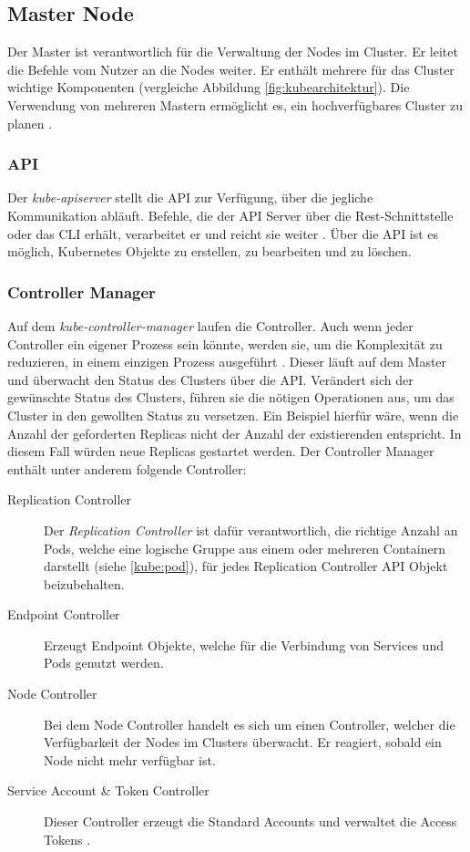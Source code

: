 \subsection{Master Node}
\label{masternode}
Der Master ist verantwortlich für die Verwaltung der Nodes im Cluster. Er leitet die Befehle vom Nutzer an die Nodes weiter. Er enthält mehrere für das Cluster wichtige Komponenten (vergleiche Abbildung \ref{fig:kubearchitektur}). Die Verwendung von mehreren Mastern ermöglicht es, ein hochverfügbares Cluster zu planen \cite[][]{9781788994729}. 

\subsubsection{API}
Der \textit{kube-apiserver} stellt die \ac{API} zur Verfügung, über die jegliche Kommunikation abläuft. Befehle, die der API Server über die Rest-Schnittstelle oder das \ac{CLI} erhält, verarbeitet er und reicht sie weiter \cite{Rensin2015Kubernetes43826}. Über die API ist es möglich, Kubernetes Objekte zu erstellen, zu bearbeiten und zu löschen.

\subsubsection{Controller Manager}
Auf dem \textit{kube-controller-manager} laufen die Controller. Auch wenn jeder Controller ein eigener Prozess sein könnte, werden sie, um die Komplexität zu reduzieren, in einem einzigen Prozess ausgeführt \cite{kube:components}. Dieser läuft auf dem Master und überwacht den Status des Clusters über die API. Verändert sich der gewünschte Status des Clusters, führen sie die nötigen Operationen aus, um das Cluster in den gewollten Status zu versetzen. Ein Beispiel hierfür wäre, wenn die Anzahl der geforderten Replicas nicht der Anzahl der existierenden entspricht. In diesem Fall würden neue Replicas gestartet werden. Der Controller Manager enthält unter anderem folgende Controller:
\begin{description}
\item[Replication Controller]
Der \textit{Replication Controller} ist dafür verantwortlich, die richtige Anzahl an Pods, welche eine logische Gruppe aus einem oder mehreren Containern darstellt (siehe \ref{kube:pod}), für jedes Replication Controller API Objekt beizubehalten.
\item[Endpoint Controller]
Erzeugt Endpoint Objekte, welche für die Verbindung von Services und Pods genutzt werden.
\item[Node Controller]
Bei dem Node Controller handelt es sich um einen Controller, welcher die Verfügbarkeit der Nodes im Clusters überwacht. Er reagiert, sobald ein Node nicht mehr verfügbar ist.
\item[Service Account \& Token Controller]
Dieser Controller er\-zeugt die Standard Accounts und verwaltet die Access Tokens \cite{kube:components}.
\end{description}

